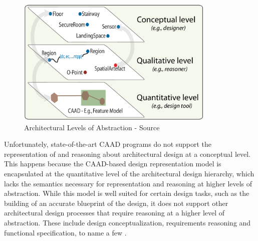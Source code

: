 \documentclass[12pt]{ucthesis}
\begin{document}
\begin{figure}[t]
\centering
\includegraphics[width=95mm]{multi-perspective-reps}
\caption{Architectural Levels of Abstraction - Source \cite{bhatt-spatial-computing}}
\label{multi-perspective-reps}
\end{figure}

Unfortunately, state-of-the-art CAAD programs \cite{ArchiCAD} \cite{AutoCAD} do not support the representation of and reasoning about architectural design at a conceptual level. This happens because the CAAD-based design representation model is encapsulated at the quantitative level of the architectural design hierarchy, which lacks the semantics necessary for representation and reasoning at higher levels of abstraction. While this model is well suited for certain design tasks, such as the building of an accurate blueprint of the design, it does not support other architectural design processes that require reasoning at a higher level of abstraction. These include design conceptualization, requirements reasoning and functional specification, to name a few \cite{bhatt-spatial-computing}. 
\end{document}
